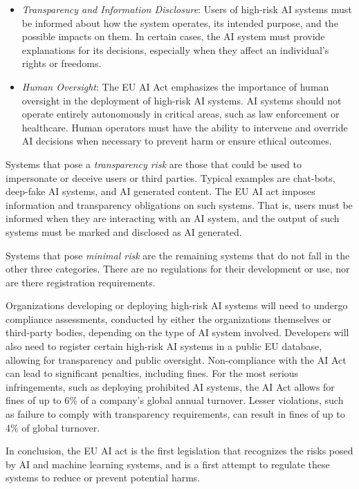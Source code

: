 \begin{advanced}
\begin{itemize}
  \item \emph{Transparency and Information Disclosure}: Users of high-risk AI systems must be informed about how the system operates, its intended purpose, and the possible impacts on them. In certain cases, the AI system must provide explanations for its decisions, especially when they affect an individual's rights or freedoms.

  \item \emph{Human Oversight}: The EU AI Act emphasizes the importance of human oversight in the deployment of high-risk AI systems. AI systems should not operate entirely autonomously in critical areas, such as law enforcement or healthcare. Human operators must have the ability to intervene and override AI decisions when necessary to prevent harm or ensure ethical outcomes.
\end{itemize}

Systems that pose a \emph{transparency risk} are those that could be used to impersonate or deceive users or third parties. Typical examples are chat-bots, deep-fake AI systems, and AI generated content. The EU AI act imposes information and transparency obligations on such systems. That is, users must be informed when they are interacting with an AI system, and the output of such systems must be marked and disclosed as AI generated. 

Systems that pose \emph{minimal risk} are the remaining systems that do not fall in the other three categories. There are no regulations for their development or use, nor are there registration requirements. 

Organizations developing or deploying high-risk AI systems will need to undergo compliance assessments, conducted by either the organizations themselves or third-party bodies, depending on the type of AI system involved. Developers will also need to register certain high-risk AI systems in a public EU database, allowing for transparency and public oversight. Non-compliance with the AI Act can lead to significant penalties, including fines. For the most serious infringements, such as deploying prohibited AI systems, the AI Act allows for fines of up to 6\% of a company's global annual turnover. Lesser violations, such as failure to comply with transparency requirements, can result in fines of up to 4\% of global turnover.

In conclusion, the EU AI act is the first legislation that recognizes the risks posed by AI and machine learning systems, and is a first attempt to regulate these systems to reduce or prevent potential harms.

\end{advanced}

